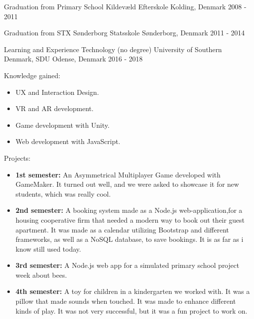 
\begin{cventries}
\cventry
{Graduation from Primary School} %
{Kildevæld Efterskole} %
{Kolding, Denmark} %
{2008 - 2011} %
{} %

\cventry
{Graduation from STX} %
{Sønderborg Statsskole} %
{Sønderborg, Denmark} %
{2011 - 2014} %
{} %

\cventry
{Learning and Experience Technology (no degree)} %
{University of Southern Denmark, SDU} %
{Odense, Denmark} %
{2016 - 2018} %
{
  \begin{cvitems} %
    \item {Knowledge gained: }
    \begin{itemize} %
      \item {UX and Interaction Design.}
      \item {VR and AR development.}
      \item {Game development with Unity.}
      \item {Web development with JavaScript.}
    \end{itemize}
    \item {Projects: }
    \begin{itemize} %
      \item {\textbf{1st semester:} An Asymmetrical Multiplayer Game developed with GameMaker. It turned out well, and we were asked to showcase it for new students, which was really cool.}
      \item {\textbf{2nd semester:} A booking system made as a Node.js web-application,for a housing cooperative firm that needed a modern way to book out their guest apartment. It was made as a calendar utilizing Bootstrap and different frameworks, as well as a NoSQL database, to save bookings. It is as far as i know still used today.}
      \item {\textbf{3rd semester:} A Node.js web app for a simulated primary school project week about bees.}
      \item {\textbf{4th semester:} A toy for children in a kindergarten we worked with. It was a pillow that made sounds when touched. It was made to enhance different kinds of play. It was not very successful, but it was a fun project to work on.}
    \end{itemize}
  \end{cvitems}
}


\end{cventries}
